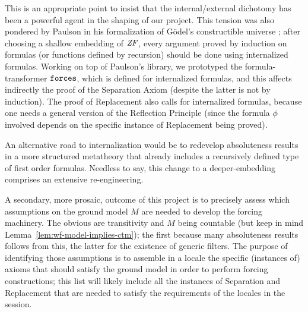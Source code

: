 This is an appropriate point to insist that the internal/external
dichotomy has been a powerful agent in the shaping of our project.
This tension was also pondered by Paulson in his formalization of
G\"odel's constructible universe \cite{paulson_2003}; after choosing a
shallow embedding of $\mathit{ZF}$, every argument proved by induction on
formulas (or functions defined by recursion) should be done using
internalized formulas. Working on top of Paulson's library, we
prototyped the formula-transformer $\mathop{\mathtt{forces}}$, which is defined for
internalized formulas, and this affects indirectly the proof of the
Separation Axiom (despite the latter is not by induction). The proof
of Replacement also calls for internalized formulas, because one needs
a general version of the Reflection Principle (since the formula
$\phi$ involved depends on the specific instance of Replacement being
proved). 

An alternative road to internalization would be to redevelop
absoluteness results in a more structured metatheory that already
includes a recursively defined type of first order formulas. Needless
to say, this change to a deeper-embedding comprises an extensive
re-engineering.

A secondary, more prosaic, outcome of this project is to precisely
assess which assumptions on the ground model $M$ are needed to develop
the forcing machinery. The obvious are transitivity and $M$ being
countable (but keep in mind Lemma~\ref{lem:wf-model-implies-ctm}); the
first because many absoluteness results follows from this, the latter
for the existence of generic filters. %
The purpose of identifying those assumptions is to assemble
in a locale the specific (instances of) axioms that should satisfy the
ground model in order to perform forcing constructions; this list will
likely include all the instances of Separation and Replacement that
are needed to satisfy the requirements of the locales in the
 session.

